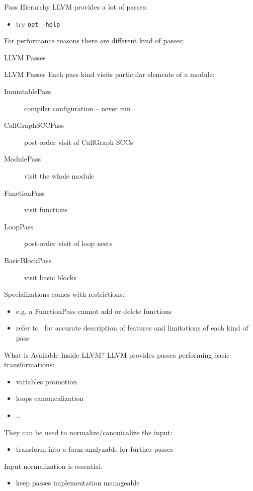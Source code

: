 \documentclass[10pt,mathserif]{beamer}
\begin{document}
\begin{frame}{Pass Hierarchy}
	LLVM provides a lot of passes:
	
	\begin{itemize}
		\item try \texttt{\smaller opt -help}
	\end{itemize}
	
	For performance reasons there are different kind of passes:
	
	\begin{block}{LLVM Passes}
		
		\centering
	\end{block}
\end{frame}

\begin{frame}{LLVM Passes}
	Each pass kind visits particular elements of a module:
	
	\begin{description}
		\item[ImmutablePass] compiler configuration -- never run
		\item[CallGraphSCCPass] post-order visit of CallGraph SCCs
		\item[ModulePass] visit the whole module
		\item[FunctionPass] visit functions
		\item[LoopPass] post-order visit of loop nests
		\item[BasicBlockPass] visit basic blocks
	\end{description}
	
	\vfill
	Specializations comes with restrictions:
	\begin{itemize}
		\item e.g. a \alert{FunctionPass} cannot add or delete functions
		\item refer to~\cite{LOCAL:www/llvmWritingAPass} for accurate description of
		features and limitations of each kind of pass
	\end{itemize}
\end{frame}

\begin{frame}{What is Available Inside LLVM?}
	LLVM provides passes performing basic transformations:
	
	\begin{itemize}
		\item variables promotion
		\item loops canonicalization
		\item \ldots
	\end{itemize}
	\vfill
	They can be used to \alert{normalize/canonicalize} the input:
	\begin{itemize}
		\item transform into a form analyzable for further passes
	\end{itemize}
	\vfill
	Input normalization is \alert{essential}:
	\begin{itemize}
		\item keep passes implementation manageable
	\end{itemize}
\end{frame}
\end{document}
